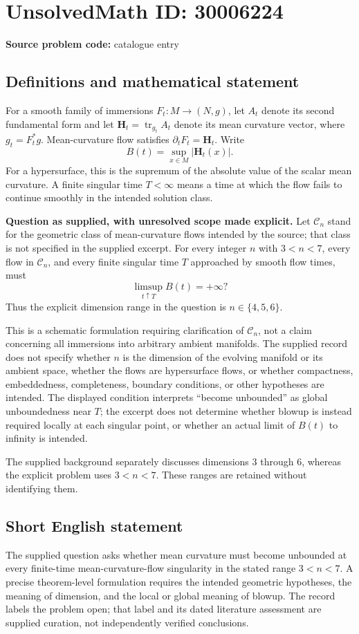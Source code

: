 \documentclass[11pt]{article}
\begin{document}
\section*{UnsolvedMath ID: 30006224}
\textbf{Source problem code:} catalogue entry
\subsection{Definitions and mathematical statement}
For a smooth family of immersions \(F_t:M\to (N,g)\), let \(A_t\) denote its second fundamental form and let \(\mathbf H_t=\operatorname{tr}_{g_t}A_t\) denote its mean curvature vector, where \(g_t=F_t^*g\). Mean-curvature flow satisfies \(\partial_tF_t=\mathbf H_t\). Write
\[
B(t)=\sup_{x\in M}|\mathbf H_t(x)|.
\]
For a hypersurface, this is the supremum of the absolute value of the scalar mean curvature. A finite singular time \(T<\infty\) means a time at which the flow fails to continue smoothly in the intended solution class.

\textbf{Question as supplied, with unresolved scope made explicit.} Let \(\mathcal C_n\) stand for the geometric class of mean-curvature flows intended by the source; that class is not specified in the supplied excerpt. For every integer \(n\) with \(3<n<7\), every flow in \(\mathcal C_n\), and every finite singular time \(T\) approached by smooth flow times, must
\[
\limsup_{t\uparrow T}B(t)=+\infty?
\]
Thus the explicit dimension range in the question is \(n\in\{4,5,6\}\).

This is a schematic formulation requiring clarification of \(\mathcal C_n\), not a claim concerning all immersions into arbitrary ambient manifolds. The supplied record does not specify whether \(n\) is the dimension of the evolving manifold or its ambient space, whether the flows are hypersurface flows, or whether compactness, embeddedness, completeness, boundary conditions, or other hypotheses are intended. The displayed condition interprets ``become unbounded'' as global unboundedness near \(T\); the excerpt does not determine whether blowup is instead required locally at each singular point, or whether an actual limit of \(B(t)\) to infinity is intended.

The supplied background separately discusses dimensions \(3\) through \(6\), whereas the explicit problem uses \(3<n<7\). These ranges are retained without identifying them.
\subsection{Short English statement}
The supplied question asks whether mean curvature must become unbounded at every finite-time mean-curvature-flow singularity in the stated range \(3<n<7\). A precise theorem-level formulation requires the intended geometric hypotheses, the meaning of dimension, and the local or global meaning of blowup. The record labels the problem open; that label and its dated literature assessment are supplied curation, not independently verified conclusions.
\end{document}
